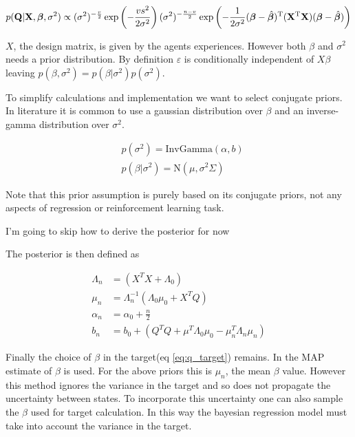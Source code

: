 \begin{equation*}
    p(\mathbf {Q} |\mathbf {X} ,{\boldsymbol {\beta }},\sigma ^{2})\propto (\sigma ^{2})^{-{\frac {v}{2}}}\exp \left(-{\frac {vs^{2}}{2{\sigma }^{2}}}\right)(\sigma ^{2})^{-{\frac {n-v}{2}}}\exp \left(-{\frac {1}{2{\sigma }^{2}}}({\boldsymbol {\beta }}-{\hat {\boldsymbol {\beta }}})^{\rm {T}}(\mathbf {X} ^{\rm {T}}\mathbf {X} )({\boldsymbol {\beta }}-{\hat {\boldsymbol {\beta }}})\right)
\end{equation*}

$X$, the design matrix, is given by the agents experiences. However both $\beta$ and $\sigma^2$ needs a prior distribution. By definition $\varepsilon$ is conditionally independent of $X\beta$ leaving $p(\beta, \sigma^2) = p(\beta|\sigma^2)p(\sigma^2)$.

To simplify calculations and implementation we want to select conjugate priors. In literature it is common to use a gaussian distribution over $\beta$ and an inverse-gamma distribution over $\sigma^2$.

\begin{align*}
	  & p(\sigma^2) = \text{InvGamma}(\alpha, b)          \\
	  & p(\beta|\sigma^2) = \text{N}(\mu, \sigma^2\Sigma) 
\end{align*}

Note that this prior assumption is purely based on its conjugate priors, not any aspects of regression or reinforcement learning task.

\todo I'm going to skip how to derive the posterior for now

The posterior is then defined as

\begin{align*}
	\Lambda_n & = (X^TX + \Lambda_0)                                         \\
	\mu_n     & = \Lambda_n^{-1}(\Lambda_0\mu_0 + X^TQ)                      \\
	\alpha_n  & = \alpha_0 + \frac{n}{2}                                     \\
	b_n       & = b_0 + (Q^TQ + \mu^T\Lambda_0\mu_0 - \mu_n^T\Lambda_n\mu_n) 
\end{align*}

Finally the choice of $\beta$ in the target(eq \ref{eq:q_target}) remains. In \cite{azziz_2018} the MAP estimate of $\beta$ is used. For the above priors this is $\mu_n$, the mean $\beta$ value. However this method ignores the variance in the target and so does not propagate the uncertainty between states. To incorporate this uncertainty one can also sample the $\beta$ used for target calculation. In this way the bayesian regression model must take into account the variance in the target.

